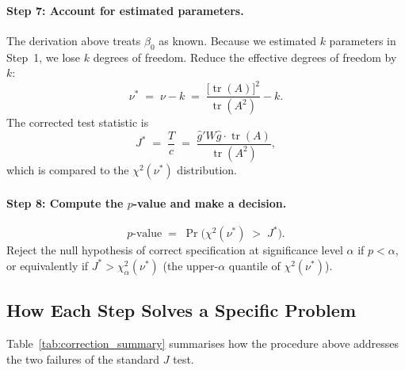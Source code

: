 \paragraph{Step 7: Account for estimated parameters.}

The derivation above treats $\beta_0$ as known.  Because we estimated
$k$ parameters in Step~1, we lose $k$ degrees of freedom.  Reduce the
effective degrees of freedom by $k$:
\begin{equation}
  \nu^* \;=\; \nu - k
            \;=\; \frac{\bigl[\operatorname{tr}(A)\bigr]^2}{\operatorname{tr}(A^2)}
              - k.
  \label{eq:nu_corrected}
\end{equation}
The corrected test statistic is
\begin{equation}
  J^* \;=\; \frac{T}{c}
           \;=\; \frac{\hat g'W\hat g \cdot \operatorname{tr}(A)}
                      {\operatorname{tr}(A^2)},
  \label{eq:jstar}
\end{equation}
which is compared to the $\chi^2(\nu^*)$ distribution.

\paragraph{Step 8: Compute the $p$-value and make a decision.}

\begin{equation}
  p\text{-value} \;=\; \Pr\!\bigl(\chi^2(\nu^*) \;>\; J^*\bigr).
  \label{eq:pvalue}
\end{equation}
Reject the null hypothesis of correct specification at significance
level $\alpha$ if $p < \alpha$, or equivalently if
$J^* > \chi^2_\alpha(\nu^*)$ (the upper-$\alpha$ quantile of
$\chi^2(\nu^*)$).

\subsection{How Each Step Solves a Specific Problem}
\label{subsec:recap}

Table~\ref{tab:correction_summary} summarises how the procedure above
addresses the two failures of the standard $J$ test.

